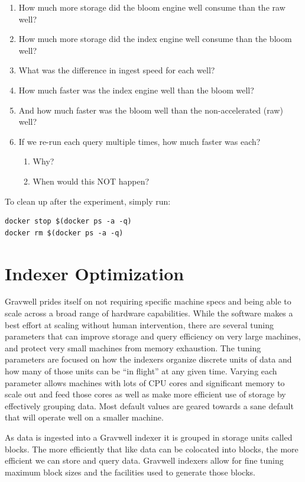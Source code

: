 \begin{enumerate}
\item How much more storage did the bloom engine well consume than the raw well?
\item How much more storage did the index engine well consume than the bloom well?
\item What was the difference in ingest speed for each well?
\item How much faster was the index engine well than the bloom well?
\item And how much faster was the bloom well than the non-accelerated (raw) well?
\item If we re-run each query multiple times, how much faster was each?
	\begin{enumerate}
	\item Why?
	\item When would this NOT happen?
	\end{enumerate}
\end{enumerate}

To clean up after the experiment, simply run:

\begin{Verbatim}[breaklines=true]
docker stop $(docker ps -a -q)
docker rm $(docker ps -a -q)
\end{Verbatim}

\section{Indexer Optimization}
Gravwell prides itself on not requiring specific machine specs and
being able to scale across a broad range of hardware capabilities.
While the software makes a best effort at scaling without human
intervention, there are several tuning parameters that can improve
storage and query efficiency on very large machines, and protect very
small machines from memory exhaustion. The tuning parameters are
focused on how the indexers organize discrete units of data and how
many of those units can be ``in flight'' at any given time. Varying
each parameter allows machines with lots of CPU cores and significant
memory to scale out and feed those cores as well as make more efficient
use of storage by effectively grouping data. Most default values are
geared towards a sane default that will operate well on a smaller
machine.

As data is ingested into a Gravwell indexer it is grouped in storage
units called blocks. The more efficiently that like data can be
colocated into blocks, the more efficient we can store and query data.
Gravwell indexers allow for fine tuning maximum block sizes and the
facilities used to generate those blocks.

